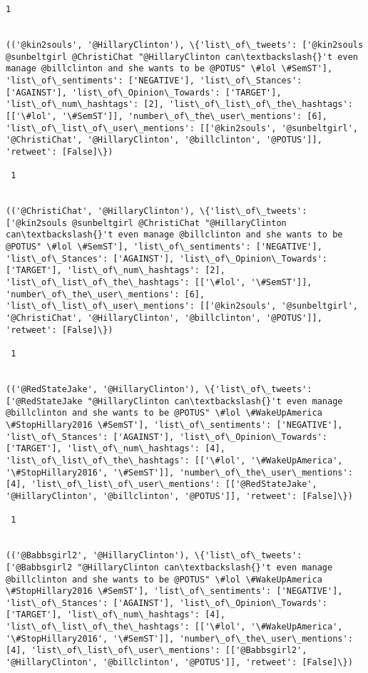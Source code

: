 \documentclass[11pt]{article}
\begin{document}
\begin{Verbatim}[commandchars=\\\{\}]
 1
 

(('@kin2souls', '@HillaryClinton'), \{'list\_of\_tweets': ['@kin2souls @sunbeltgirl @ChristiChat "@HillaryClinton can\textbackslash{}'t even manage @billclinton and she wants to be @POTUS" \#lol \#SemST'], 'list\_of\_sentiments': ['NEGATIVE'], 'list\_of\_Stances': ['AGAINST'], 'list\_of\_Opinion\_Towards': ['TARGET'], 'list\_of\_num\_hashtags': [2], 'list\_of\_list\_of\_the\_hashtags': [['\#lol', '\#SemST']], 'number\_of\_the\_user\_mentions': [6], 'list\_of\_list\_of\_user\_mentions': [['@kin2souls', '@sunbeltgirl', '@ChristiChat', '@HillaryClinton', '@billclinton', '@POTUS']], 'retweet': [False]\})

 1
 

(('@ChristiChat', '@HillaryClinton'), \{'list\_of\_tweets': ['@kin2souls @sunbeltgirl @ChristiChat "@HillaryClinton can\textbackslash{}'t even manage @billclinton and she wants to be @POTUS" \#lol \#SemST'], 'list\_of\_sentiments': ['NEGATIVE'], 'list\_of\_Stances': ['AGAINST'], 'list\_of\_Opinion\_Towards': ['TARGET'], 'list\_of\_num\_hashtags': [2], 'list\_of\_list\_of\_the\_hashtags': [['\#lol', '\#SemST']], 'number\_of\_the\_user\_mentions': [6], 'list\_of\_list\_of\_user\_mentions': [['@kin2souls', '@sunbeltgirl', '@ChristiChat', '@HillaryClinton', '@billclinton', '@POTUS']], 'retweet': [False]\})

 1
 

(('@RedStateJake', '@HillaryClinton'), \{'list\_of\_tweets': ['@RedStateJake "@HillaryClinton can\textbackslash{}'t even manage @billclinton and she wants to be @POTUS" \#lol \#WakeUpAmerica \#StopHillary2016 \#SemST'], 'list\_of\_sentiments': ['NEGATIVE'], 'list\_of\_Stances': ['AGAINST'], 'list\_of\_Opinion\_Towards': ['TARGET'], 'list\_of\_num\_hashtags': [4], 'list\_of\_list\_of\_the\_hashtags': [['\#lol', '\#WakeUpAmerica', '\#StopHillary2016', '\#SemST']], 'number\_of\_the\_user\_mentions': [4], 'list\_of\_list\_of\_user\_mentions': [['@RedStateJake', '@HillaryClinton', '@billclinton', '@POTUS']], 'retweet': [False]\})

 1
 

(('@Babbsgirl2', '@HillaryClinton'), \{'list\_of\_tweets': ['@Babbsgirl2 "@HillaryClinton can\textbackslash{}'t even manage @billclinton and she wants to be @POTUS" \#lol \#WakeUpAmerica \#StopHillary2016 \#SemST'], 'list\_of\_sentiments': ['NEGATIVE'], 'list\_of\_Stances': ['AGAINST'], 'list\_of\_Opinion\_Towards': ['TARGET'], 'list\_of\_num\_hashtags': [4], 'list\_of\_list\_of\_the\_hashtags': [['\#lol', '\#WakeUpAmerica', '\#StopHillary2016', '\#SemST']], 'number\_of\_the\_user\_mentions': [4], 'list\_of\_list\_of\_user\_mentions': [['@Babbsgirl2', '@HillaryClinton', '@billclinton', '@POTUS']], 'retweet': [False]\})


\end{Verbatim}
\end{document}
